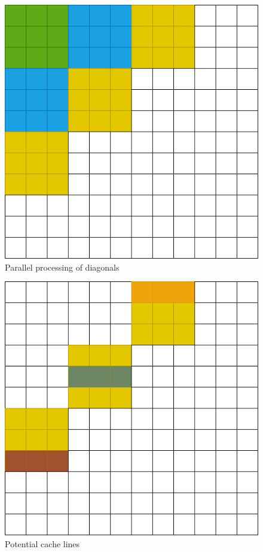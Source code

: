 \documentclass[manuscript,screen, nonacm=true]{acmart}
\begin{document}
\begin{figure}[h]
    \centering
    \includegraphics[scale=0.25]{diag}
    \caption{Parallel processing of diagonals}
    \label{fig:diag}
\end{figure}
\begin{figure}[h]
    \centering
    \includegraphics[scale=0.25]{cachelines}
    \caption{Potential cache lines}
    \label{fig:cachelines}
\end{figure}
\end{document}
